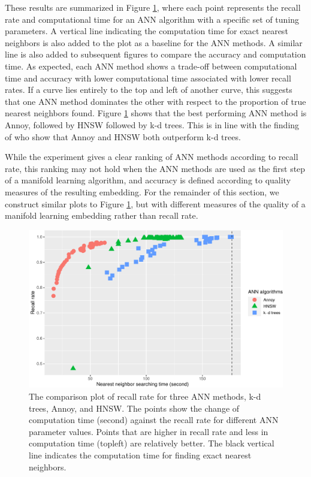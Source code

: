 \documentclass[11pt,a4paper,]{article}
\begin{document}
These results are summarized in Figure \ref{fig:recall}, where each point represents the recall rate and computational time for an ANN algorithm with a specific set of tuning parameters.
A vertical line indicating the computation time for exact nearest neighbors is also added to the plot as a baseline for the ANN methods. A similar line is also added to subsequent figures to compare the accuracy and computation time. As expected, each ANN method shows a trade-off between computational time and accuracy with lower computational time associated with lower recall rates. If a curve lies entirely to the top and left of another curve, this suggests that one ANN method dominates the other with respect to the proportion of true nearest neighbors found. Figure \ref{fig:recall} shows that the best performing ANN method is Annoy, followed by HNSW followed by k-d trees. This is in line with the finding of \textcite{Aumuller2020-nk} who show that Annoy and HNSW both outperform k-d trees.

While the experiment gives a clear ranking of ANN methods according to recall rate, this ranking may not hold when the ANN methods are used as the first step of a manifold learning algorithm, and accuracy is defined according to quality measures of the resulting embedding. For the remainder of this section, we construct similar plots to Figure \ref{fig:recall}, but with different measures of the quality of a manifold learning embedding rather than recall rate.

\begin{figure}

{\centering \includegraphics[width=0.8\linewidth]{mlann_ebs_files/figure-latex/recall-1} 

}

\caption{The comparison plot of recall rate for three ANN methods, k-d trees, Annoy, and HNSW. The points show the change of computation time (second) against the recall rate for different ANN parameter values. Points that are higher in recall rate and less in computation time (topleft) are relatively better. The black vertical line indicates the computation time for finding exact nearest neighbors. }\label{fig:recall}
\end{figure}
\end{document}

